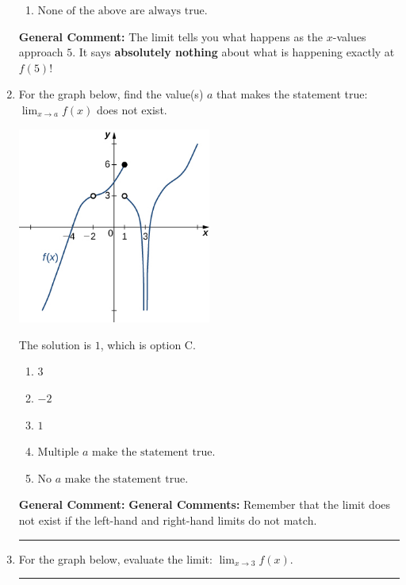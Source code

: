 \documentclass{extbook}[14pt]
\newcommand{\litem}[1]{\item #1

\rule{\textwidth}{0.4pt}}
\begin{document}
\begin{enumerate}
{\begin{enumerate}[label=\Alph*.]
\item \( \text{None of the above are always true.} \)


\end{enumerate}

\textbf{General Comment:} The limit tells you what happens as the $x$-values approach $5$. It says \textbf{absolutely nothing} about what is happening exactly at $f(5)$!
}
\litem{
For the graph below, find the value(s) $a$ that makes the statement true: $ \displaystyle \lim_{x \rightarrow a} f(x)$ does not exist.

\begin{center}
    \includegraphics[width=0.5\textwidth]{../Figures/evaluateLimitGraphicallyCopyC.png}
\end{center}


The solution is \( 1 \), which is option C.\begin{enumerate}[label=\Alph*.]
\item \( 3 \)


\item \( -2 \)


\item \( 1 \)


\item \( \text{Multiple } a \text{ make the statement true}. \)


\item \( \text{No } a \text{ make the statement true}. \)


\end{enumerate}

\textbf{General Comment:} \textbf{General Comments:} Remember that the limit does not exist if the left-hand and right-hand limits do not match.
}
\litem{
For the graph below, evaluate the limit: $ \displaystyle \lim_{x \rightarrow 3} f(x)$.

}
\end{enumerate}
\end{document}
